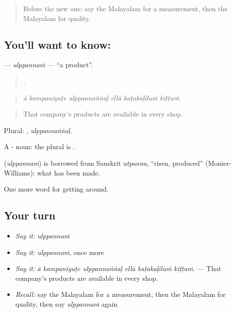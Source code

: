 \begin{quote}
Before the new one: say the Malayalam for a measurement, then the Malayalam for quality.
\end{quote}

\subsection*{You'll want to know: }
\textbf{} — \emph{ulppannaṁ} — \textquotedblleft{}a product\textquotedblright{}.

\begin{quote}
     .
\end{quote}

\begin{quote}
\emph{ā kampaniyuṭe ulppannaṅṅaḷ ellā kaṭakaḷiluṁ kiṭṭuṁ.}
\end{quote}

\begin{quote}
That company's products are available in every shop.
\end{quote}

Plural: , \emph{ulppannaṅṅaḷ}.

A - noun: the plural is .

\begin{cousinweb}
\textbf{} (\emph{ulppannaṁ}) is borrowed from Sanskrit \emph{utpanna}, \textquotedblleft{}risen, produced\textquotedblright{} (Monier-Williams): what has been made.
\end{cousinweb}

\begin{grammarlens}[title={What you've built}]
One more word for getting around.
\end{grammarlens}

\subsection*{Your turn}
\begin{itemize}
\raggedright
  \item \emph{Say it:} \emph{ulppannaṁ}
  \item \emph{Say it:} \emph{ulppannaṁ}, once more
  \item \emph{Say it:} \emph{ā kampaniyuṭe ulppannaṅṅaḷ ellā kaṭakaḷiluṁ kiṭṭuṁ.} — That company's products are available in every shop.
  \item \emph{Recall:} say the Malayalam for a measurement, then the Malayalam for quality, then say \emph{ulppannaṁ} again
\end{itemize}

